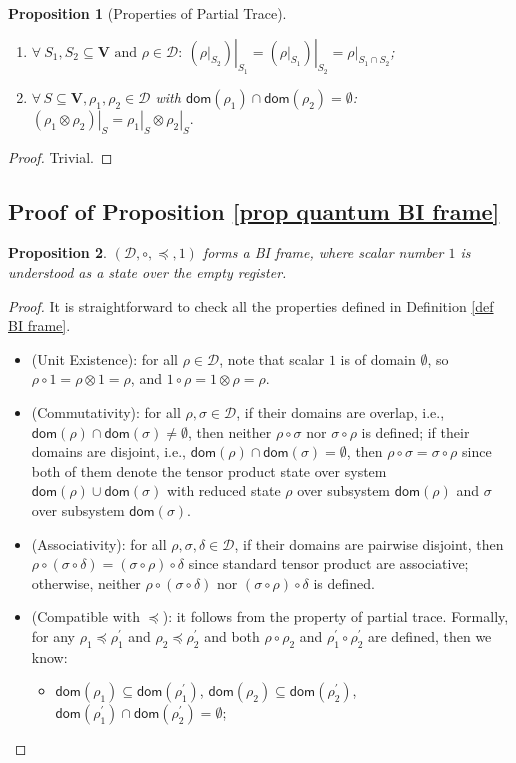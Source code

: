 \documentclass[conference,compsoc, 10pt]{IEEEtran}
\newtheorem{proposition}{Proposition}[section]
\newcommand {\cD } {{\mathcal{D}}}
\newcommand {\dom }[1] {{\mathsf{dom}\!\left(#1\right)}}
\newcommand {\type }[1] {{\mathsf{dom}\!\left(#1\right)}}
\newcommand {\rt }[2] {{\left.{#1}\right|_{#2}}}
\newcommand {\vars } {\mathbf{V}}
\begin{document}
\begin{appendices}
		\begin{proposition}[Properties of Partial Trace]
			\label{pro-rt}
			\begin{enumerate}
				\item $\forall\ S_1,S_2\subseteq \vars \text{\ and\ }\rho\in\cD:\ \rt{(\rt{\rho}{S_2})}{S_1} = \rt{(\rt{\rho}{S_1})}{S_2} = \rt{\rho}{S_1\cap S_2}$;
				\item $\forall\,S\subseteq\vars,\rho_1,\rho_2\in\cD$ with $\type{\rho_1}\cap\type{\rho_2}=\emptyset$:  $\rt{(\rho_1\otimes\rho_2)}{S} = \rt{\rho_1}{S}\otimes\rt{\rho_2}{S}.$
			\end{enumerate}
		\end{proposition}
		\begin{proof}
			Trivial.
		\end{proof}
		
		\subsection{Proof of Proposition \ref{prop quantum BI frame}}
		
		\begin{proposition}
			$(\cD,\circ, \preceq,1)$ forms a BI frame, where scalar number $1$ is understood as a state over the empty register. 
		\end{proposition}
		\begin{proof}
			It is straightforward to check all the properties defined in Definition \ref{def BI frame}.
			\begin{itemize}
				\item (Unit Existence): for all $\rho\in\cD$, note that scalar $1$ is of domain $\emptyset$, so $\rho\circ 1 = \rho\otimes 1 = \rho$, and $1\circ\rho = 1\otimes \rho = \rho$.
				\item (Commutativity): for all $\rho,\sigma\in\cD$, if their domains are overlap, i.e., $\dom {\rho}\cap\dom {\sigma}\neq\emptyset$, then neither $\rho\circ\sigma$ nor $\sigma\circ\rho$ is defined; if their domains are disjoint, i.e., $\dom {\rho}\cap\dom {\sigma}=\emptyset$, then $\rho\circ\sigma = \sigma\circ\rho$ since both of them denote the tensor product state over system $\dom {\rho}\cup\dom {\sigma}$ with reduced state $\rho$ over subsystem $\dom {\rho}$ and $\sigma$ over subsystem $\dom {\sigma}$.
				\item (Associativity): for all $\rho,\sigma, \delta\in\cD$, if their domains are pairwise disjoint, then $\rho\circ(\sigma\circ\delta) = (\sigma\circ\rho)\circ\delta$ since standard tensor product are associative; otherwise, neither $\rho\circ(\sigma\circ\delta)$ nor $(\sigma\circ\rho)\circ\delta$ is defined.
				\item (Compatible with $\preceq$): it follows from the property of partial trace. Formally, for any $\rho_1\preceq\rho_1^\prime$ and $\rho_2\preceq\rho_2^\prime$ and both $\rho\circ\rho_2$ and $\rho_1^\prime\circ\rho_2^\prime$ are defined, then we know:
				\begin{itemize}
					\item $\dom{\rho_1}\subseteq\dom{\rho_1^\prime}$, $\dom{\rho_2}\subseteq\dom{\rho_2^\prime}$, $\dom{\rho_1^\prime}\cap\dom{\rho_2^\prime} = \emptyset$;
					

\end{itemize}
\end{itemize}
\end{proof}
\end{appendices}
\end{document}
